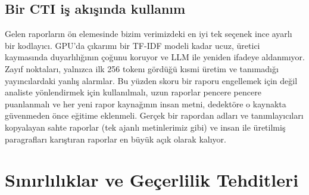 \documentclass[journal]{IEEEtran}
\begin{document}
\subsection{Bir CTI iş akışında kullanım}
Gelen raporların ön elemesinde bizim verimizdeki en iyi tek seçenek ince ayarlı bir kodlayıcı. GPU'da çıkarımı bir
TF-IDF modeli kadar ucuz, üretici kaymasında duyarlılığının çoğunu koruyor ve LLM ile yeniden ifadeye aldanmıyor.
Zayıf noktaları, yalnızca ilk 256 tokenı gördüğü kısmi üretim ve tanımadığı yayıncılardaki yanlış alarmlar. Bu
yüzden skoru bir raporu engellemek için değil analiste yönlendirmek için kullanılmalı, uzun raporlar pencere
pencere puanlanmalı ve her yeni rapor kaynağının insan metni, dedektöre o kaynakta güvenmeden önce eğitime
eklenmeli. Gerçek bir rapordan adları ve tanımlayıcıları kopyalayan sahte raporlar (tek ajanlı metinlerimiz gibi)
ve insan ile üretilmiş paragrafları karıştıran raporlar en büyük açık olarak kalıyor.

\section{Sınırlılıklar ve Geçerlilik Tehditleri}\label{sec:limits}
\end{document}
